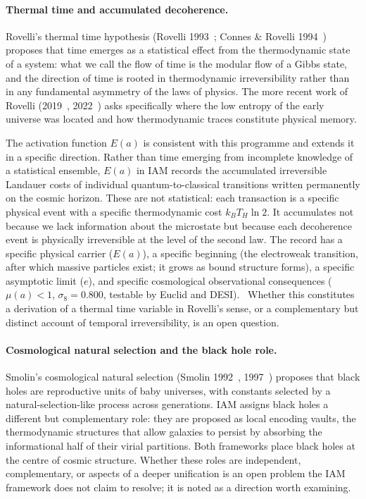 \paragraph{Thermal time and accumulated decoherence.} Rovelli's thermal time hypothesis (Rovelli 1993~\cite{Rovelli1993}; Connes \& Rovelli
1994~\cite{ConnesRovelli1994}) proposes that time emerges as a statistical effect from the thermodynamic state of a system: what we call the flow of time is
the modular flow of a Gibbs state, and the direction of time is rooted in thermodynamic irreversibility rather than in any fundamental asymmetry of the laws
of physics. The more recent work of Rovelli (2019~\cite{Rovelli2019}, 2022~\cite{Rovelli2022}) asks specifically where the low entropy of the early universe
was located and how thermodynamic traces constitute physical memory.

The activation function $E(a)$ is consistent with this programme and extends it in a specific direction. Rather than time emerging from incomplete knowledge
of a statistical ensemble, $E(a)$ in IAM records the accumulated irreversible Landauer costs of individual quantum-to-classical transitions written
permanently on the cosmic horizon. These are not statistical: each transaction is a specific physical event with a specific thermodynamic cost $k_BT_H\ln2$.
It accumulates not because we lack information about the microstate but because each decoherence event is physically irreversible at the level of the
second law. The record has a specific physical carrier ($E(a)$), a specific beginning (the electroweak transition, after which massive particles exist; it grows as bound structure forms), a
specific asymptotic limit ($e$), and specific cosmological observational consequences ($\mu(a)<1$, $\sigma_8=0.800$, testable by Euclid and DESI).
\interp\ Whether this constitutes a derivation of a thermal time variable in Rovelli's sense, or a complementary but distinct account of temporal
irreversibility, is an open question. \openprob

\paragraph{Cosmological natural selection and the black hole role.} Smolin's cosmological natural selection (Smolin 1992~\cite{Smolin1992},
1997~\cite{Smolin1997}) proposes that black holes are reproductive units of baby universes, with constants selected by a natural-selection-like process across
generations. IAM assigns black holes a different but complementary role: they are proposed as local encoding vaults, the thermodynamic structures that allow
galaxies to persist by absorbing the informational half of their virial partitions. Both frameworks place black holes at the centre of cosmic structure.
Whether these roles are independent, complementary, or aspects of a deeper unification is an open problem the IAM framework does not claim to resolve; it is
noted as a direction worth examining. \conjecture

